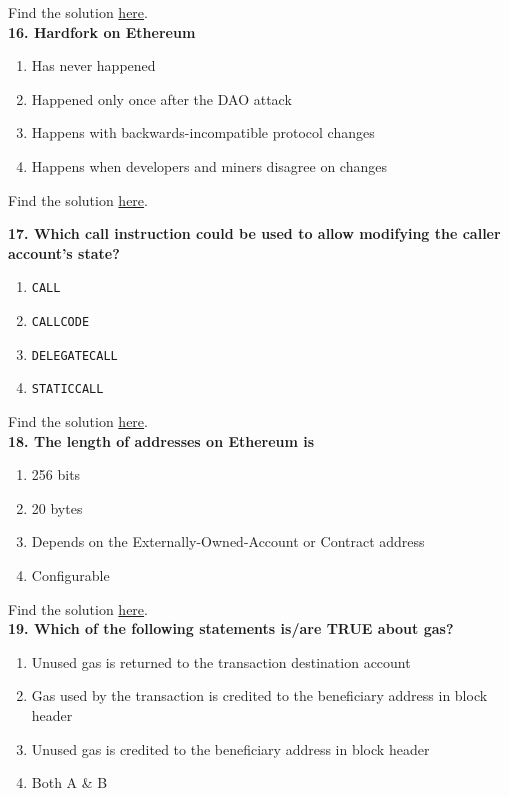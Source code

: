 Find the solution \hyperref[sec:exam1_q15]{here}.\\

\textbf{16. Hardfork on Ethereum}

\begin{enumerate}[label=\Alph*.]
    \item Has never happened
    \item Happened only once after the DAO attack
    \item Happens with backwards-incompatible protocol changes
    \item Happens when developers and miners disagree on changes
\end{enumerate}

Find the solution \hyperref[sec:exam1_q16]{here}.\\

\pagebreak

\textbf{17. Which call instruction could be used to allow modifying the caller account’s state?}

\begin{enumerate}[label=\Alph*.]
    \item\verb|CALL|
    \item\verb|CALLCODE|
    \item\verb|DELEGATECALL|
    \item\verb|STATICCALL|
\end{enumerate}

Find the solution \hyperref[sec:exam1_q17]{here}.\\

\textbf{18. The length of addresses on Ethereum is}

\begin{enumerate}[label=\Alph*.]
    \item 256 bits
    \item 20 bytes
    \item Depends on the Externally-Owned-Account or Contract address
    \item Configurable
\end{enumerate}

Find the solution \hyperref[sec:exam1_q18]{here}.\\

\textbf{19. Which of the following statements is/are TRUE about gas?}

\begin{enumerate}[label=\Alph*.]
    \item Unused gas is returned to the transaction destination account
    \item Gas used by the transaction is credited to the beneficiary address in block header
    \item Unused gas is credited to the beneficiary address in block header
    \item Both A \& B
\end{enumerate}

